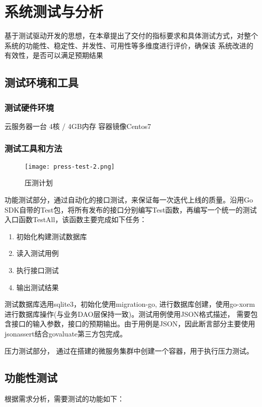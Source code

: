 
\chapter{系统测试与分析}
基于测试驱动开发的思想，在本章提出了交付的指标要求和具体测试方式，对整个系统的功能性、稳定性、并发性、可用性等多维度进行评价，确保该
系统改进的有效性，是否可以满足预期结果

\section{测试环境和工具}

\subsection{测试硬件环境}
云服务器一台
4核 / 4GB内存
容器镜像Centos7

\subsection{测试工具和方法}


\begin{figure}[H]
    \centering
    \texttt{[image: press-test-2.png]}
    \caption{压测计划}
    \label{fig:6-1-2}
\end{figure}

功能测试部分，通过自动化的接口测试，来保证每一次迭代上线的质量\cite{zw3}。沿用Go SDK自带的Test包，将所有发布的接口分别编写Test函数，再编写一个统一的测试
入口函数TestAll，该函数主要完成如下任务：
\begin{enumerate}
    \item 初始化构建测试数据库
    \item 读入测试用例
    \item 执行接口测试
    \item 输出测试结果
\end{enumerate}

测试数据库选用sqlite3，初始化使用migration-go, 进行数据库创建，使用go-xorm进行数据库操作(与业务DAO层保持一致)。测试用例使用JSON格式描述，
需要包含接口的输入参数，接口的预期输出。由于用例是JSON，因此断言部分主要使用jsonassert结合govaluate第三方包完成。

压力测试部分， 通过在搭建的微服务集群中创建一个容器，用于执行压力测试\cite{zw4}。


\section{功能性测试}
根据需求分析，需要测试的功能如下：

